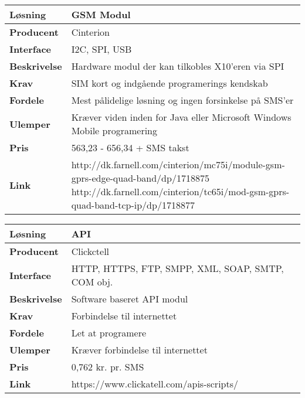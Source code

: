 \begin{table}[!htbp] \centering
	\label{tab:GSM1}
\begin{tabular}{|p{6cm}|p{8cm}|}
	\hline
		\textbf{Løsning}				&GSM Modul \\ \hline
		\textbf{Producent} 			&Cinterion \\ \hline
		\textbf{Interface} 			&I2C, SPI, USB \\ \hline
		\textbf{Beskrivelse} 		&Hardware modul der kan tilkobles X10'eren via SPI \\ \hline
		\textbf{Krav} 				&SIM kort og indgående programerings kendskab \\ \hline
		\textbf{Fordele}				&Mest pålidelige løsning og ingen forsinkelse på SMS'er \\ \hline
		\textbf{Ulemper} 			&Kræver viden inden for Java eller Microsoft Windows Mobile programering \\ \hline
		\textbf{Pris} 				&563,23 - 656,34 + SMS takst \\ \hline
		\textbf{Link} 				&http://dk.farnell.com/cinterion/mc75i/module-gsm-gprs-edge-quad-band/dp/1718875 \newline
									 http://dk.farnell.com/cinterion/tc65i/mod-gsm-gprs-quad-band-tcp-ip/dp/1718877 \\ \hline		
\end{tabular}
\end{table}

\begin{table}[!htbp] \centering
	\label{tab:GSM2}
\begin{tabular}{|p{6cm}|p{8cm}|}
	\hline
		\textbf{Løsning}				&API \\ \hline
		\textbf{Producent} 			&Clickctell \\ \hline
		\textbf{Interface} 			&HTTP, HTTPS, FTP, SMPP, XML, SOAP, SMTP, COM obj.\\ \hline
		\textbf{Beskrivelse} 		&Software baseret API modul \\ \hline
		\textbf{Krav} 				&Forbindelse til internettet \\ \hline
		\textbf{Fordele}				&Let at programere \\ \hline
		\textbf{Ulemper} 			&Kræver forbindelse til internettet \\ \hline
		\textbf{Pris} 				&0,762 kr. pr. SMS \\ \hline
		\textbf{Link} 				&https://www.clickatell.com/apis-scripts/ \\ \hline		
\end{tabular}
\end{table}

